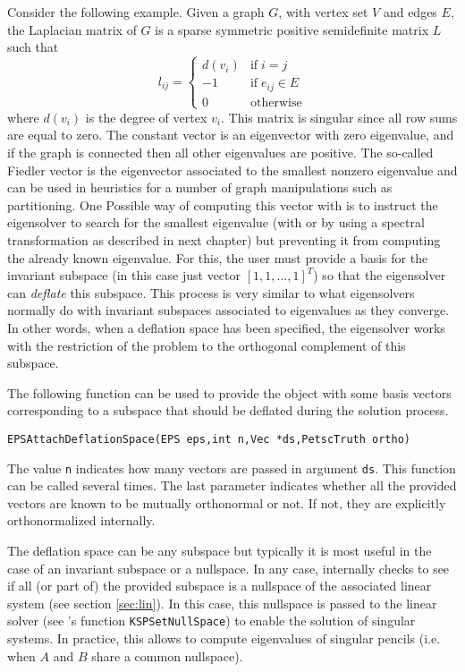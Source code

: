 	Consider the following example. Given a graph $G$, with vertex set $V$ and edges $E$, the Laplacian matrix of $G$ is a sparse symmetric positive semidefinite matrix $L$ such that
$$l_{ij}=\left\{\begin{array}{cl}
         d(v_i) & \mathrm{if}\;i=j\\
         -1 & \mathrm{if}\;e_{ij}\in E\\
         0&\mathrm{otherwise}
\end{array}\right.$$
where $d(v_i)$ is the degree of vertex $v_i$. This matrix is singular since all row sums are equal to zero. The constant vector is an eigenvector with zero eigenvalue, and if the graph is connected then all other eigenvalues are positive. The so-called Fiedler vector is the eigenvector associated to the smallest nonzero eigenvalue and can be used in heuristics for a number of graph manipulations such as partitioning. One Possible way of computing this vector with \slepc is to instruct the eigensolver to search for the smallest eigenvalue (with  or by using a spectral transformation as described in next chapter) but preventing it from computing the already known eigenvalue. For this, the user must provide a basis for the invariant subspace (in this case just vector $[1,1,\ldots,1]^T$) so that the eigensolver can \emph{deflate} this subspace. This process is very similar to what eigensolvers normally do with invariant subspaces associated to eigenvalues as they converge. In other words, when a deflation space has been specified, the eigensolver works with the restriction of the problem to the orthogonal complement of this subspace.

	The following function can be used to provide the  object with some basis vectors corresponding to a subspace that should be deflated during the solution process. 
	\begin{Verbatim}[fontsize=\small]
	EPSAttachDeflationSpace(EPS eps,int n,Vec *ds,PetscTruth ortho)
	\end{Verbatim}
The value \texttt{n} indicates how many vectors are passed in argument \texttt{ds}. This function can be called several times. The last parameter indicates whether all the provided vectors are known to be mutually orthonormal or not. If not, they are explicitly orthonormalized internally.

	The deflation space can be any subspace but typically it is most useful in the case of an invariant subspace or a nullspace. In any case, \slepc internally checks to see if all (or part of) the provided subspace is a nullspace of the associated linear system (see section \ref{sec:lin}). In this case, this nullspace is passed to the linear solver (see \petsc's function \texttt{KSPSetNullSpace}) to enable the solution of singular systems. In practice, this allows to compute eigenvalues of singular pencils (i.e. when $A$ and $B$ share a common nullspace).

